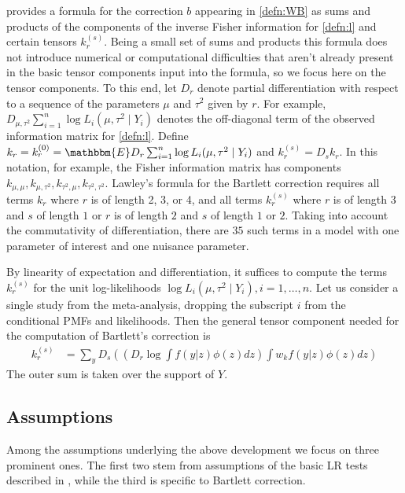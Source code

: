 \documentclass[12pt]{article}
\newcommand{\E}{\mathbbm{E}}
\newcommand{\z}{z}
\newcommand{\Y}{Y}
\renewcommand{\k}{k}
\newcommand{\kterm}{\k_r^{(s)}}
\newcommand{\n}{n}
\newcommand{\w}{w}
\newcommand{\effect}{\mu}
\begin{document}
\citet{lawley:56} provides a formula for the correction $b$ appearing
in \eqref{defn:WB} as sums and products of the components of the
inverse Fisher information for \eqref{defn:l} and certain tensors $\kterm$. Being a small set
of sums and products this formula does not introduce numerical or
computational difficulties that aren't already present in the basic
tensor components input into the formula, so we focus here on the
tensor components. To this end, let $D_r$ denote partial differentiation with
respect to a sequence of the parameters $\effect$ and $\tau^2$ given
by $r$. For example,
$D_{\mu,\tau^2}\sum_{i=1}^n\log L_i(\effect,\tau^2\mid \Y_i)$ denotes
the off-diagonal term of the observed information matrix for \eqref{defn:l}. Define
$\k_r=\k_r^{(0)}=\E D_r \sum_{i=1}^n\log L_i(\effect,\tau^2\mid \Y_i)$
and $\k_r^{(s)} = D_s \k_r$. In this notation, for example, the Fisher
information matrix has components
$\k_{\mu,\mu}, \k_{\mu,\tau^2}, \k_{\tau^2,\mu},
\k_{\tau^2,\tau^2}$. Lawley's formula for the Bartlett correction
requires all terms $\k_r$ where $r$ is of length 2, 3, or 4, and all
terms $\k_r^{(s)}$ where $r$ is of length $3$ and $s$ of length $1$ or
$r$ is of length $2$ and $s$ of length $1$ or $2$. Taking into account the commutativity of differentiation,
 there are $35$
such terms in a model with one parameter of interest and one nuisance
parameter.

By linearity of expectation and differentiation, it suffices to
compute the terms $\k_r^{(s)}$ for the unit log-likelihoods
$\log L_i(\effect,\tau^2\mid \Y_i), i=1,\ldots,\n$. 
Let us consider a single study from the meta-analysis, dropping the
subscript $i$ from the conditional PMFs and likelihoods. Then the general tensor component needed for the computation of Bartlett's correction is
\begin{align}
  k_r^{(s)} 
  &=  \sum_y D_s\left( \left(D_r \log\int f(y|\z)\phi(\z)d\z\right)  \int \w_k f(y|\z)\phi(\z)d\z\right)
    \label{defn:k-term-exact}
\end{align}
The outer sum is taken over the support of $\Y$.

\subsection{Assumptions}

Among the assumptions underlying the above development we focus on three
prominent ones. The first two stem from assumptions of the  basic LR tests described in \citet{stijnen:10}, while the third is specific to Bartlett correction.
\end{document}
